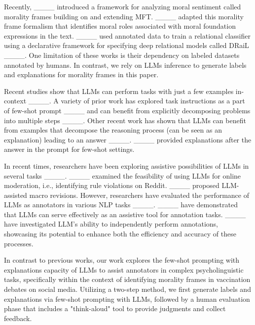 Recently, ____ introduced a framework for analyzing moral sentiment called morality frames building on and extending MFT. ____ adapted this morality frame formalism that identifies moral roles associated with moral foundation expressions in the text. 
____ used annotated data to train a relational classifier using a declarative framework for specifying deep relational models called DRaiL ____. One limitation of these works is their dependency on labeled datasets annotated by humans. 
In contrast, we rely on LLMs inference to generate labels and explanations for morality frames in this paper.

Recent studies show that LLMs can perform tasks with just a few examples in-context ____. A variety of prior work has
explored task instructions as a part of few-shot prompt ____ and can benefit from explicitly decomposing problems into multiple steps ____. Other recent work has shown that LLMs can benefit from examples that decompose the reasoning process (can be seen as an explanation) leading to an answer ____. ____ provided explanations after the answer in the prompt for few-shot settings. 


In recent times, researchers have been exploring assistive possibilities of LLMs in several tasks ____. ____ examined the feasibility of using LLMs for online moderation, i.e.,
identifying rule violations on Reddit. ____ proposed LLM-assisted macro revisions. However, researchers have evaluated the performance of LLMs as annotators in various NLP tasks ____. ____ have demonstrated that LLMs can serve effectively as an assistive tool for annotation tasks. ____ have investigated LLM's ability to independently perform annotations, showcasing its potential to enhance both the efficiency and accuracy of these processes. 

In contrast to previous works, our work explores the few-shot prompting with explanations capacity of LLMs to assist annotators in complex psycholinguistic tasks, specifically within the context of identifying morality frames in vaccination debates on social media. Utilizing a two-step method, we first generate labels and explanations via few-shot prompting with LLMs, followed by a human evaluation phase that includes a "think-aloud" tool to provide judgments and collect feedback. 

